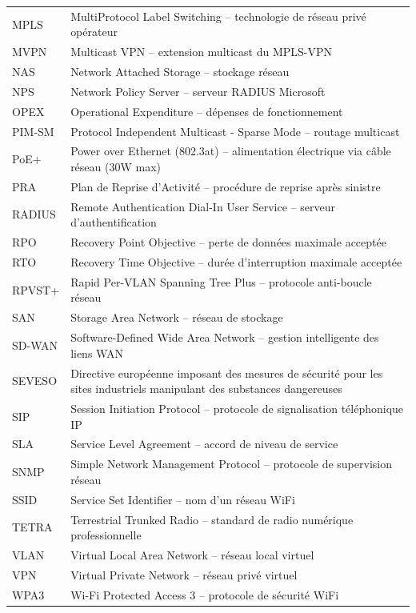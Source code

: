 \documentclass[12pt,a4paper]{report}
\begin{document}
\begin{longtable}{p{3.5cm}p{10cm}}
\addlinespace
MPLS & MultiProtocol Label Switching -- technologie de réseau privé opérateur \\
\addlinespace
MVPN & Multicast VPN -- extension multicast du MPLS-VPN \\
\addlinespace
NAS & Network Attached Storage -- stockage réseau \\
\addlinespace
NPS & Network Policy Server -- serveur RADIUS Microsoft \\
\addlinespace
OPEX & Operational Expenditure -- dépenses de fonctionnement \\
\addlinespace
PIM-SM & Protocol Independent Multicast - Sparse Mode -- routage multicast \\
\addlinespace
PoE+ & Power over Ethernet (802.3at) -- alimentation électrique via câble réseau (30W max) \\
\addlinespace
PRA & Plan de Reprise d'Activité -- procédure de reprise après sinistre \\
\addlinespace
RADIUS & Remote Authentication Dial-In User Service -- serveur d'authentification \\
\addlinespace
RPO & Recovery Point Objective -- perte de données maximale acceptée \\
\addlinespace
RTO & Recovery Time Objective -- durée d'interruption maximale acceptée \\
\addlinespace
RPVST+ & Rapid Per-VLAN Spanning Tree Plus -- protocole anti-boucle réseau \\
\addlinespace
SAN & Storage Area Network -- réseau de stockage \\
\addlinespace
SD-WAN & Software-Defined Wide Area Network -- gestion intelligente des liens WAN \\
\addlinespace
SEVESO & Directive européenne imposant des mesures de sécurité pour les sites industriels manipulant des substances dangereuses \\
\addlinespace
SIP & Session Initiation Protocol -- protocole de signalisation téléphonique IP \\
\addlinespace
SLA & Service Level Agreement -- accord de niveau de service \\
\addlinespace
SNMP & Simple Network Management Protocol -- protocole de supervision réseau \\
\addlinespace
SSID & Service Set Identifier -- nom d'un réseau WiFi \\
\addlinespace
TETRA & Terrestrial Trunked Radio -- standard de radio numérique professionnelle \\
\addlinespace
VLAN & Virtual Local Area Network -- réseau local virtuel \\
\addlinespace
VPN & Virtual Private Network -- réseau privé virtuel \\
\addlinespace
WPA3 & Wi-Fi Protected Access 3 -- protocole de sécurité WiFi \\
\bottomrule
\end{longtable}
\end{document}
